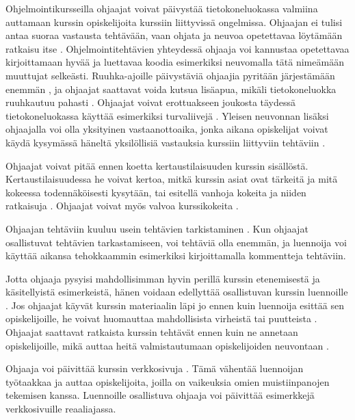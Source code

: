 \documentclass[finnish]{tktltiki2}
\theoremstyle{definition}
\theoremstyle{remark}
\begin{document}
Ohjelmointikursseilla ohjaajat voivat päivystää tietokoneluokassa valmiina auttamaan kurssin opiskelijoita kurssiin liittyvissä ongelmissa. Ohjaajan ei tulisi antaa suoraa vastausta tehtävään, vaan ohjata ja neuvoa opetettavaa löytämään ratkaisu itse \cite{Vikberg, Kurhila11}. Ohjelmointitehtävien yhteydessä ohjaaja voi kannustaa opetettavaa kirjoittamaan hyvää ja luettavaa koodia esimerkiksi neuvomalla tätä nimeämään muuttujat selkeästi. Ruuhka-ajoille päivystäviä ohjaajia pyritään järjestämään enemmän \cite{Reges88, Reges03}, ja ohjaajat saattavat voida kutsua lisäapua, mikäli tietokoneluokka ruuhkautuu pahasti \cite{Kurhila11}. Ohjaajat voivat erottuakseen joukosta täydessä tietokoneluokassa käyttää esimerkiksi turvaliivejä \cite{Vihavainen}. Yleisen neuvonnan lisäksi ohjaajalla voi olla yksityinen vastaanottoaika, jonka aikana opiskelijat voivat käydä kysymässä häneltä yksilöllisiä vastauksia kurssiin liittyviin tehtäviin \cite{Decker06}. \par

Ohjaajat voivat pitää ennen koetta kertaustilaisuuden kurssin sisällöstä. Kertaustilaisuudessa he voivat kertoa, mitkä kurssin asiat ovat tärkeitä ja mitä kokeessa todennäköisesti kysytään, tai esitellä vanhoja kokeita ja niiden ratkaisuja \cite{Decker06}. Ohjaajat voivat myös valvoa kurssikokeita \cite{Richards00}. \par

Ohjaajan tehtäviin kuuluu usein tehtävien tarkistaminen \cite{Dickson11}. Kun ohjaajat osallistuvat tehtävien tarkastamiseen, voi tehtäviä olla enemmän, ja luennoija voi käyttää aikansa tehokkaammin esimerkiksi kirjoittamalla kommentteja tehtäviin. \par

Jotta ohjaaja pysyisi mahdollisimman hyvin perillä kurssin etenemisestä ja käsitellyistä esimerkeistä, hänen voidaan edellyttää osallistuvan kurssin luennoille \cite{Reges03, Decker06}. Jos ohjaajat käyvät kurssin materiaalin läpi jo ennen kuin luennoija esittää sen opiskelijoille, he voivat huomauttaa mahdollisista virheistä tai puutteista \cite{Vikberg}. Ohjaajat saattavat ratkaista kurssin tehtävät ennen kuin ne annetaan opiskelijoille, mikä auttaa heitä valmistautumaan opiskelijoiden neuvontaan \cite{Vihavainen}. \par

Ohjaaja voi päivittää kurssin verkkosivuja \cite{Dickson11}. Tämä vähentää luennoijan työtaakkaa ja auttaa opiskelijoita, joilla on vaikeuksia omien muistiinpanojen tekemisen kanssa. Luennoille osallistuva ohjaaja voi päivittää esimerkkejä verkkosivuille reaaliajassa. \par
\end{document}
